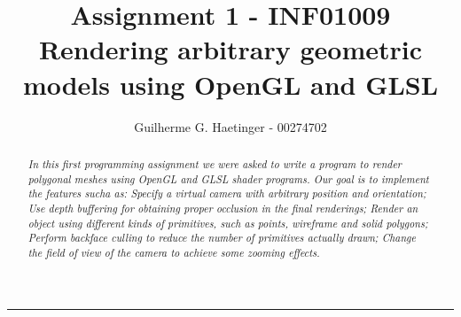 \documentclass{article}
\title{Assignment 1 - INF01009 \\ Rendering arbitrary geometric models using OpenGL and GLSL}
\author{Guilherme G. Haetinger - 00274702}
\newcommand{\hl}{\noindent\rule{\textwidth}{0.5pt}}
\begin{document}
    \maketitle

  \begin{abstract}
  \textit{
  In this first programming assignment we were asked to write a program to render
polygonal meshes using OpenGL and GLSL shader programs. Our goal is to implement
the features sucha as: Specify a virtual camera with arbitrary position and orientation;
Use depth buffering for obtaining proper occlusion in the final renderings; Render an
object using different kinds of primitives, such as points, wireframe and solid polygons;
Perform backface culling to reduce the number of primitives actually drawn; Change
the field of view of the camera to achieve some zooming effects.
  }

  \end{abstract}

  \hl
  \vspace{2em}
\end{document}
